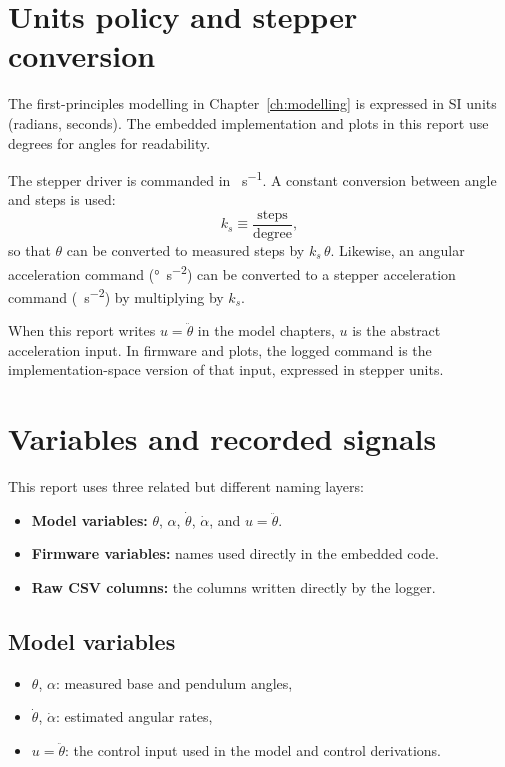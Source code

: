 \section{Units policy and stepper conversion}
The first-principles modelling in Chapter~\ref{ch:modelling} is expressed in SI units (radians, seconds). The embedded implementation and plots in this report use degrees for angles for readability.

The stepper driver is commanded in \si{\step\per\second}. A constant conversion between angle and steps is used:
\[
k_s \equiv \frac{\text{steps}}{\text{degree}},
\]
so that $\theta$ can be converted to measured steps by $k_s\,\theta$. Likewise, an angular acceleration command (\si{\degree\per\second\squared}) can be converted to a stepper acceleration command (\si{\step\per\second\squared}) by multiplying by $k_s$.

When this report writes $u=\ddot{\theta}$ in the model chapters, $u$ is the abstract acceleration input. In firmware and plots, the logged command is the implementation-space version of that input, expressed in stepper units.

\section{Variables and recorded signals}
This report uses three related but different naming layers:
\begin{itemize}
  \item \textbf{Model variables:} $\theta$, $\alpha$, $\dot{\theta}$, $\dot{\alpha}$, and $u=\ddot{\theta}$.
  \item \textbf{Firmware variables:} names used directly in the embedded code.
  \item \textbf{Raw CSV columns:} the columns written directly by the logger.
\end{itemize}

\subsection*{Model variables}
\begin{itemize}
  \item $\theta$, $\alpha$: measured base and pendulum angles,
  \item $\dot{\theta}$, $\dot{\alpha}$: estimated angular rates,
  \item $u=\ddot{\theta}$: the control input used in the model and control derivations.
\end{itemize}

